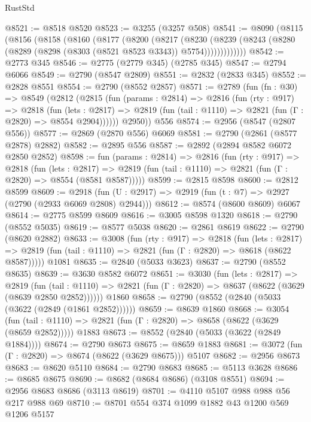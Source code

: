 \begin{lexlean}{RustStd}
\begin{coremodule}
{\begin{coremodule}
{{{{{{{{{{{{{{{{{{{{{{{{{{@8521 := @8518 @8520
@8523 := @3255 (@3257 @508)
@8541 := @8090
    (@8115
      (@8156
        (@8158
          (@8160
            (@8177
              (@8200
                (@8217
                  (@8230
                    (@8239
                      (@8243 (@8280 (@8289 (@8298 (@8303 (@8521 @8523 @3343)) @5754)))))))))))))
@8542 := @2773 @345
@8546 := @2775 (@2779 @345) (@2785 @345)
@8547 := @2794 @6066
@8549 := @2790 (@8547 @2809)
@8551 := @2832 (@2833 @345)
@8552 := @2828 @8551
@8554 := @2790 (@8552 @2857)
@8571 := @2789
    (fun (fn : @30) =>
    @8549
      (@2812
        (@2815
          (fun (params : @2814) =>
          @2816
            (fun (rty : @917) =>
            @2818
              (fun (lets : @2817) =>
              @2819 (fun (tail : @1110) => @2821 (fun (Γ : @2820) => @8554 @2904))))))
        @2950))
    @556
@8574 := @2956 (@8547 (@2807 @556))
@8577 := @2869 (@2870 @556) @6069
@8581 := @2790 (@2861 (@8577 @2878) @2882)
@8582 := @2895 @556
@8587 := @2892 (@2894 @8582 @6072 @2850 @2852)
@8598 := fun (params : @2814) =>
  @2816
    (fun (rty : @917) =>
    @2818
      (fun (lets : @2817) =>
      @2819 (fun (tail : @1110) => @2821 (fun (Γ : @2820) => @8554 (@8581 @8587)))))
@8599 := @2815 @8598
@8600 := @2812 @8599
@8609 := @2918 (fun (U : @2917) => @2919 (fun (t : @7) => @2927 (@2790 (@2933 @6069 @2808) @2944)))
@8612 := @8574 (@8600 @8609) @6067
@8614 := @2775 @8599 @8609
@8616 := @3005 @8598 @1320
@8618 := @2790 (@8552 @5035)
@8619 := @8577 @5038
@8620 := @2861 @8619
@8622 := @2790 (@8620 @2882)
@8633 := @3008
    (fun (rty : @917) =>
    @2818
      (fun (lets : @2817) =>
      @2819 (fun (tail : @1110) => @2821 (fun (Γ : @2820) => @8618 (@8622 @8587)))))
    @1081
@8635 := @2840 (@5033 @3623)
@8637 := @2790 (@8552 @8635)
@8639 := @3630 @8582 @6072
@8651 := @3030
    (fun (lets : @2817) =>
    @2819
      (fun (tail : @1110) => @2821 (fun (Γ : @2820) => @8637 (@8622 (@3629 (@8639 @2850 @2852))))))
    @1860
@8658 := @2790 (@8552 (@2840 (@5033 (@3622 (@2849 (@1861 @2852))))))
@8659 := @8639 @1860
@8668 := @3054
    (fun (tail : @1110) => @2821 (fun (Γ : @2820) => @8658 (@8622 (@3629 (@8659 @2852)))))
    @1883
@8673 := @8552 (@2840 (@5033 (@3622 (@2849 @1884))))
@8674 := @2790 @8673
@8675 := @8659 @1883
@8681 := @3072 (fun (Γ : @2820) => @8674 (@8622 (@3629 @8675))) @5107
@8682 := @2956 @8673
@8683 := @8620 @5110
@8684 := @2790 @8683
@8685 := @5113 @3628
@8686 := @8685 @8675
@8690 := @8682 (@8684 @8686) (@3108 @8551)
@8694 := @2956 @8683 @8686 (@3113 @8619)
@8701 := @4110 @5107 @988 @988 @56 @217 @988 @69
@8710 := @8701 @554 @374 @1099 @1882 @43 @1200 @569 @1206 @5157
}}}}}}}}}}}}}}}}}}}}}}}}}}
\end{coremodule}}
\end{coremodule}
\end{lexlean}
